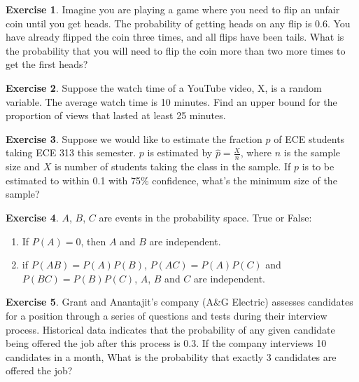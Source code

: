 \documentclass[12pt]{amsart}
\theoremstyle{definition}
\newtheorem{exercise}{Exercise}
\numberwithin{equation}{section}
\theoremstyle{plain}
\begin{document}
\begin{exercise}
    Imagine you are playing a game where you need to flip an unfair coin until you get heads. The probability of getting heads on any flip is 0.6. You have already flipped the coin three times, and all flips have been tails. What is the probability that you will need to flip the coin more than two more times to get the first heads? %
\end{exercise}

\begin{exercise}
    Suppose the watch time of a YouTube video, X, is a random variable. The average watch time is 10 minutes. Find an upper bound for the proportion of views that lasted at least 25 minutes. %
\end{exercise}

\begin{exercise}
    Suppose we would like to estimate the fraction $p$ of ECE students taking ECE 313 this semester. $p$ is estimated by $\widehat{p}=\frac{X}{n}$, where $n$ is the sample size and $X$ is number of students taking the class in the sample. If $p$ is to be estimated to within 0.1 with 75\% confidence, what’s the minimum size of the sample? %
\end{exercise}

\begin{exercise}
    $A$, $B$, $C$ are events in the probability space. True or False:
    \begin{enumerate}[label=(\Alph*)]
        \item If $P(A)=0$, then $A$ and $B$ are independent.
        \item if $P(AB) = P(A)P(B)$, $P(AC) = P(A)P(C)$ and $P(BC) = P(B)P(C)$, $A$, $B$ and $C$ are independent. 
    \end{enumerate}
\end{exercise}

\begin{exercise}
    Grant and Anantajit's company (A\&G Electric) assesses candidates for a position through a series of questions and tests during their interview process. Historical data indicates that the probability of any given candidate being offered the job after this process is 0.3. If the company interviews 10 candidates in a month, What is the probability that exactly 3 candidates are offered the job?%
\end{exercise}
\end{document}
